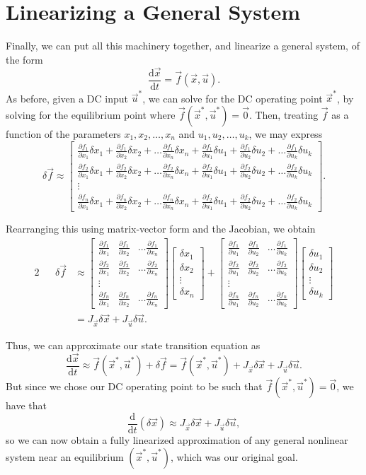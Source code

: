 \documentclass[letterpaper]{article}
\theoremstyle{remark}
\newcommand{\dt}{\mathrm{d}t}
\newcommand{\diff}{\mathrm{d}}
\newcommand{\mat}[1]{\ensuremath{\begin{bmatrix}#1\end{bmatrix}}}
\newcommand{\eqn}[1]{\begin{alignat*}{2}#1\end{alignat*}}
\newcommand{\p}[2]{\frac{\partial #1}{\partial #2}}
\begin{document}
\section{Linearizing a General System}
Finally, we can put all this machinery together, and linearize a general system, of the form
\[
    \frac{\diff \vec{x}}{\dt} = \vec{f}(\vec{x}, \vec{u}).
\]
As before, given a DC input $\vec{u}^*$, we can solve for the DC operating point $\vec{x}^*$, by solving for the equilibrium point where $\vec{f}(\vec{x}^*, \vec{u}^*) = \vec{0}$. Then, treating $\vec{f}$ as a function of the parameters $x_1, x_2, \ldots, x_n$ and $u_1, u_2, \ldots, u_k$, we may express
\[
    \delta \vec{f} \approx \mat{
    \p{f_1}{x_1} \delta x_1 + \p{f_1}{x_2} \delta x_2 + \ldots \p{f_1}{x_n} \delta x_n + 
    \p{f_1}{u_1} \delta u_1 + \p{f_1}{u_2} \delta u_2 + \ldots \p{f_1}{u_k} \delta u_k \\
    \p{f_2}{x_1} \delta x_1 + \p{f_2}{x_2} \delta x_2 + \ldots \p{f_2}{x_n} \delta x_n + 
    \p{f_2}{u_1} \delta u_1 + \p{f_2}{u_2} \delta u_2 + \ldots \p{f_2}{u_k} \delta u_k \\
    \vdots \\
    \p{f_n}{x_1} \delta x_1 + \p{f_n}{x_2} \delta x_2 + \ldots \p{f_n}{x_n} \delta x_n + 
    \p{f_2}{u_1} \delta u_1 + \p{f_2}{u_2} \delta u_2 + \ldots \p{f_2}{u_k} \delta u_k}. 
\]

Rearranging this using matrix-vector form and the Jacobian, we obtain
\eqn{
    && \delta \vec{f} &\approx \mat{
    \p{f_1}{x_1} & \p{f_1}{x_2} & \ldots \p{f_1}{x_n} \\
    \p{f_2}{x_1} & \p{f_2}{x_2} & \ldots \p{f_2}{x_n} \\
    \vdots \\
    \p{f_n}{x_1} & \p{f_n}{x_2} & \ldots \p{f_n}{x_n}} \mat{\delta x_1 \\ \delta x_2 \\ \vdots \\ \delta x_n} + \mat{
    \p{f_1}{u_1} & \p{f_1}{u_2} & \ldots \p{f_1}{u_k} \\
    \p{f_2}{u_1} & \p{f_2}{u_2} & \ldots \p{f_2}{u_k} \\
    \vdots \\
    \p{f_n}{u_1} & \p{f_n}{u_2} & \ldots \p{f_n}{u_k}} \mat{\delta u_1 \\ \delta u_2 \\ \vdots \\ \delta u_k} \\
    &&&= J_{\vec{x}} \delta \vec{x} + J_{\vec{u}} \delta \vec{u}.
}

Thus, we can approximate our state transition equation as
\[
    \frac{\diff \vec{x}}{\dt} \approx \vec{f}(\vec{x}^*, \vec{u}^*) + \delta\vec{f} = \vec{f}(\vec{x}^*, \vec{u}^*) + J_{\vec{x}} \delta \vec{x} + J_{\vec{u}} \delta \vec{u}.
\]
But since we chose our DC operating point to be such that $\vec{f}(\vec{x}^*, \vec{u}^*) = \vec{0}$, we have that
\[
    \frac{\diff}{\dt}(\delta \vec{x}) \approx J_{\vec{x}} \delta \vec{x} + J_{\vec{u}} \delta \vec{u},
\]
so we can now obtain a fully linearized approximation of any general nonlinear system near an equilibrium $(\vec{x}^*, \vec{u}^*)$, which was our original goal.
\end{document}
